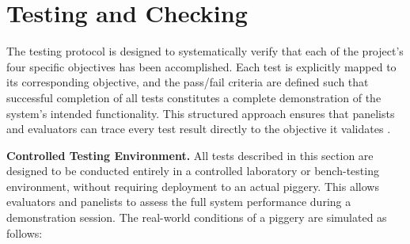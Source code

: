 \section{Testing and Checking}
\label{sec:testing_protocol}
The testing protocol is designed to systematically verify that each of the project's four specific objectives has been accomplished. Each test is explicitly mapped to its corresponding objective, and the pass/fail criteria are defined such that successful completion of all tests constitutes a complete demonstration of the system's intended functionality. This structured approach ensures that panelists and evaluators can trace every test result directly to the objective it validates \cite{adeoye2025animalia,dingcong2017monitoring,beyondtech2025smart}.

\textbf{Controlled Testing Environment.}
All tests described in this section are designed to be conducted entirely in a controlled laboratory or bench-testing environment, without requiring deployment to an actual piggery. This allows evaluators and panelists to assess the full system performance during a demonstration session. The real-world conditions of a piggery are simulated as follows:

